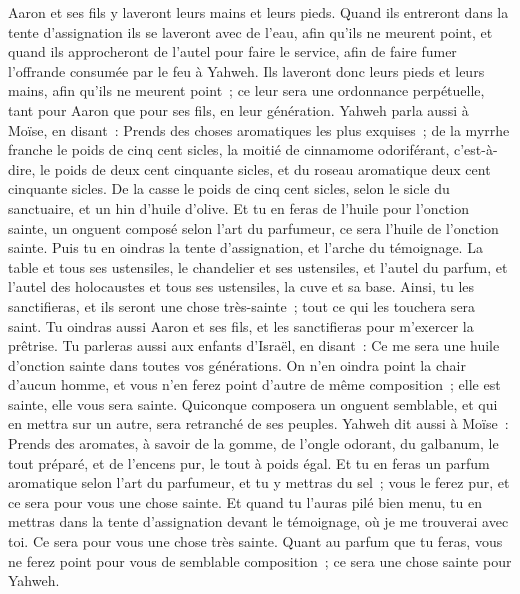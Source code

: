 \begin{multicols}{2}
Aaron et ses fils y laveront leurs mains et leurs pieds.
Quand ils entreront dans la tente d'assignation ils se laveront avec de l'eau, afin qu'ils ne meurent point, et quand ils approcheront de l'autel pour faire le service, afin de faire fumer l'offrande consumée par le feu à Yahweh.
Ils laveront donc leurs pieds et leurs mains, afin qu'ils ne meurent point~; ce leur sera une ordonnance perpétuelle, tant pour Aaron que pour ses fils, en leur génération.
Yahweh parla aussi à Moïse, en disant~:
Prends des choses aromatiques les plus exquises~; de la myrrhe franche le poids de cinq cent sicles, la moitié de cinnamome odoriférant, c'est-à-dire, le poids de deux cent cinquante sicles, et du roseau aromatique deux cent cinquante sicles.
De la casse le poids de cinq cent sicles, selon le sicle du sanctuaire, et un hin d'huile d'olive.
Et tu en feras de l'huile pour l'onction sainte, un onguent composé selon l'art du parfumeur, ce sera l'huile de l'onction sainte.
Puis tu en oindras la tente d'assignation, et l'arche du témoignage.
La table et tous ses ustensiles, le chandelier et ses ustensiles, et l'autel du parfum,
 et l'autel des holocaustes et tous ses ustensiles, la cuve et sa base.
Ainsi, tu les sanctifieras, et ils seront une chose très-sainte~; tout ce qui les touchera sera saint.
Tu oindras aussi Aaron et ses fils, et les sanctifieras pour m'exercer la prêtrise.
Tu parleras aussi aux enfants d'Israël, en disant~: Ce me sera une huile d'onction sainte dans toutes vos générations.
On n'en oindra point la chair d'aucun homme, et vous n'en ferez point d'autre de même composition~; elle est sainte, elle vous sera sainte.
Quiconque composera un onguent semblable, et qui en mettra sur un autre, sera retranché de ses peuples.
Yahweh dit aussi à Moïse~: Prends des aromates, à savoir de la gomme, de l'ongle odorant, du galbanum, le tout préparé, et de l'encens pur, le tout à poids égal.
Et tu en feras un parfum aromatique selon l'art du parfumeur, et tu y mettras du sel~; vous le ferez pur, et ce sera pour vous une chose sainte.
Et quand tu l'auras pilé bien menu, tu en mettras dans la tente d'assignation devant le témoignage, où je me trouverai avec toi. Ce sera pour vous une chose très sainte.
Quant au parfum que tu feras, vous ne ferez point pour vous de semblable composition~; ce sera une chose sainte pour Yahweh.

\end{multicols}
